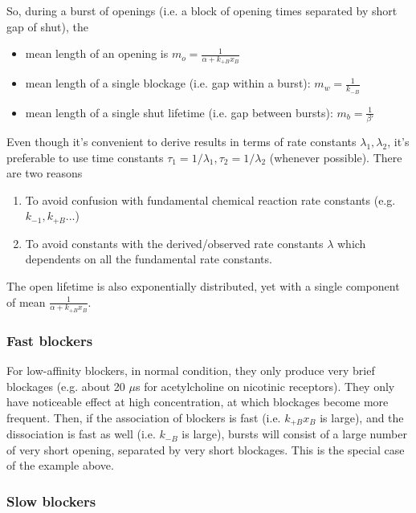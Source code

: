 So, during a burst of openings (i.e. a block of opening times
separated by short gap of shut), the
\begin{itemize}
\item mean length of an opening is $m_o=\frac{1}{\alpha+k_{+B}x_B}$
\item mean length of a single blockage (i.e. gap within a burst):
  $m_w=\frac{1}{k_{-B}}$
\item mean length of a single shut lifetime (i.e. gap between bursts):
  $m_b=\frac{1}{\beta'}$
\end{itemize}

\begin{framed}
  Even though it's convenient to derive results in terms of rate
  constants $\lambda_1,\lambda_2$, it's preferable to use time
  constants $\tau_1=1/\lambda_1,\tau_2=1/\lambda_2$ (whenever
  possible). There are two reasons
  \begin{enumerate}
  \item To avoid confusion with fundamental chemical reaction rate
    constants (e.g. $k_{-1},k_{+B}$...)
  \item To avoid constants with the derived/observed rate constants
    $\lambda$ which dependents on all the fundamental rate constants.
  \end{enumerate}
\end{framed}
 The open lifetime is also exponentially distributed, yet with a
 single component of mean $\frac{1}{\alpha+k_{+B}x_B}$.

 \subsubsection{Fast blockers}
 \label{sec:fast-blockers}

 For low-affinity blockers, in normal condition, they only produce
 very brief blockages (e.g. about 20 $\mu$s for acetylcholine on
 nicotinic receptors). They only have noticeable effect at high
 concentration, at which blockages become more frequent.  Then, if the
 association of blockers is fast (i.e. $k_{+B}x_B$ is large), and the
 dissociation is fast as well (i.e. $k_{-B}$ is large), bursts will
 consist of a large number of very short opening, separated by very
 short blockages. This is the special case of the example above.

\subsubsection{Slow blockers}
\label{sec:slow-blockers}

